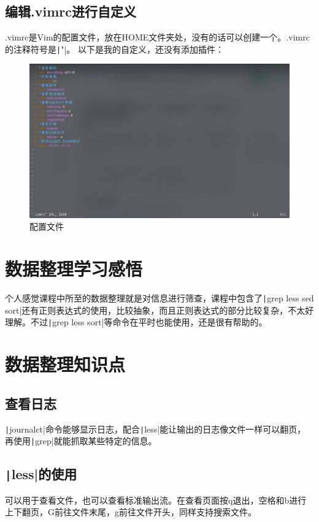 \documentclass[fontset=ubuntu]{ctexart}
\begin{document}
\begin{sloppypar}
\subsection{编辑.vimrc进行自定义}
.vimrc是Vim的配置文件，放在HOME文件夹处，没有的话可以创建一个。.vimrc的注释符号是\texttt|"|。
以下是我的自定义，还没有添加插件：
\begin{figure}[htb]
    \centering
    \includegraphics[width=0.75\linewidth]{.vimrc_1.png}
    \caption{配置文件}
    \label{fig:.vimrc_1}
\end{figure}

\section{数据整理学习感悟}
个人感觉课程中所至的数据整理就是对信息进行筛查，课程中包含了\texttt|grep less sed sort|还有正则表达式的使用，比较抽象，而且正则表达式的部分比较复杂，不太好理解。不过\texttt|grep less sort|等命令在平时也能使用，还是很有帮助的。

\section{数据整理知识点}
\subsection{查看日志}
\texttt|journalct|命令能够显示日志，配合\texttt|less|能让输出的日志像文件一样可以翻页，再使用\texttt|grep|就能抓取某些特定的信息。

\subsection{\texttt|less|的使用}
可以用于查看文件，也可以查看标准输出流。在查看页面按q退出，空格和b进行上下翻页，G前往文件末尾，g前往文件开头，同样支持搜索文件。


\end{sloppypar}
\end{document}
